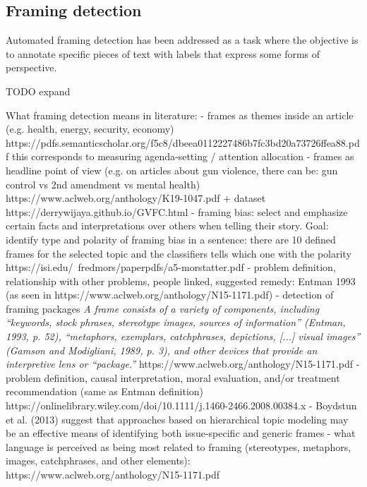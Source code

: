 \subsection{Framing detection}
\label{ssec:lit_framing_auto}

Automated framing detection has been addressed as a task where the objective is to annotate specific pieces of text with labels that express some forms of perspective.

TODO expand


What framing detection means in literature:
- frames as themes inside an article (e.g. health, energy, security, economy) https://pdfs.semanticscholar.org/f5c8/dbeea0112227486b7fc3bd20a73726ffea88.pdf this corresponds to measuring agenda-setting / attention allocation
- frames as headline point of view (e.g. on articles about gun violence, there can be: gun control vs 2nd amendment vs mental health) https://www.aclweb.org/anthology/K19-1047.pdf + dataset
https://derrywijaya.github.io/GVFC.html
- framing bias: select and emphasize certain facts and interpretations over others when telling their story. Goal: identify type and polarity of framing bias in a sentence: there are 10 defined frames for the selected topic and the classifiers tells which one with the polarity https://isi.edu/~fredmors/paperpdfs/a5-morstatter.pdf
- problem definition, relationship with other problems, people linked, suggested remedy: Entman 1993 (as seen in https://www.aclweb.org/anthology/N15-1171.pdf)
- detection of framing packages  \textit{A frame consists of a variety of components, including “keywords, stock phrases, stereotype images, sources of information” (Entman, 1993, p. 52), “metaphors, exemplars, catchphrases, depictions, [...] visual images” (Gamson and Modigliani, 1989, p. 3), and other devices that provide an interpretive lens or “package.”} https://www.aclweb.org/anthology/N15-1171.pdf
- problem definition, causal interpretation, moral evaluation, and/or treatment recommendation (same as Entman definition) https://onlinelibrary.wiley.com/doi/10.1111/j.1460-2466.2008.00384.x
- Boydstun et al. (2013) suggest that approaches based on hierarchical topic modeling may be an effective means of identifying both issue-specific and generic frames
- what language is perceived as being most related to framing (stereotypes, metaphors, images, catchphrases, and other elements): https://www.aclweb.org/anthology/N15-1171.pdf
